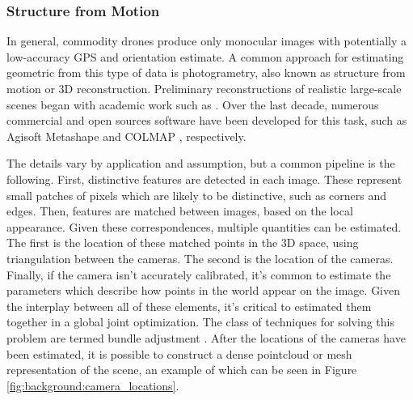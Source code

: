 \subsubsection{Structure from Motion}
In general, commodity drones produce only monocular images with potentially a low-accuracy GPS and orientation estimate. A common approach for estimating geometric from this type of data is photogrametry, also known as structure from motion or 3D reconstruction.  Preliminary reconstructions of realistic large-scale scenes began with academic work such as \cite{Agarwal2009}. Over the last decade, numerous commercial and open sources software have been developed for this task, such as Agisoft Metashape \cite{AgisoftMetashape} and COLMAP \cite{schoenberger2016mvs, schoenberger2016sfm}, respectively.

The details vary by application and assumption, but a common pipeline is the following. First, distinctive features are detected in each image. These represent small patches of pixels which are likely to be distinctive, such as corners and edges. Then, features are matched between images, based on the local appearance. 
Given these correspondences, multiple quantities can be estimated. The first is the location of these matched points in the 3D space, using triangulation between the cameras. The second is the location of the cameras. Finally, if the camera isn't accurately calibrated, it's common to estimate the parameters which describe how points in the world appear on the image. Given the interplay between all of these elements, it's critical to estimated them together in a global joint optimization. The class of techniques for solving this problem are termed bundle adjustment \cite{Triggs2000BundleSynthesis}. After the locations of the cameras have been estimated, it is possible to construct a dense pointcloud or mesh representation of the scene, an example of which can be seen in Figure \ref{fig:background:camera_locations}.

